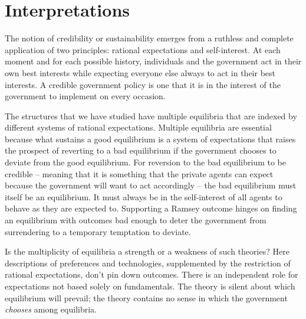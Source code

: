 \vfill\supereject

\section{Interpretations}\label{sec:spe_interpretations}%
  The notion of credibility or sustainability emerges from a ruthless
and complete application of two principles: rational expectations and
self-interest.  At each moment and for each possible history, individuals and
the government act in their own best interests while expecting everyone else
always to act in their best interests.  A credible government policy is one
that it is in the interest of the government to implement on every occasion.

  The structures that we have studied have multiple equilibria that are
indexed by different systems of rational expectations.  Multiple
equilibria are essential because what
sustains a good equilibrium is a system of expectations that
raises the prospect of reverting to a bad equilibrium
if the government chooses to deviate from the good equilibrium.  For
 reversion to the bad equilibrium to be
credible  -- meaning that it is something that the private agents can expect because the
government will want to act accordingly -- the bad equilibrium must itself be an equilibrium.  It must always be in the self-interest of all agents to behave as they
are expected to.  Supporting a Ramsey outcome hinges
on finding an equilibrium with outcomes bad enough to
deter the government from surrendering to a temporary temptation
to deviate.
%
%


  Is the multiplicity of equilibria a strength or a weakness of such
theories?  Here descriptions of preferences
and technologies, supplemented by the restriction of rational
expectations, don't pin down outcomes. There is an independent role
for expectations not based solely on fundamentals.
  The theory is silent about which
equilibrium will prevail; the theory contains no sense in which the
government {\it chooses\/} among equilibria.

